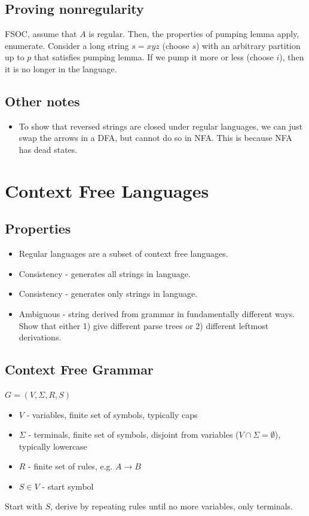 \documentclass{article}
\begin{document}
\subsection{Proving nonregularity}
FSOC, assume that $A$ is regular. Then, the properties of pumping lemma apply, enumerate. Consider a long string $s=xyz$ (choose $s$) with an arbitrary partition up to $p$ that satisfies pumping lemma. If we pump it more or less (choose $i$), then it is no longer in the language.

\subsection{Other notes}
\begin{itemize}
    \item To show that reversed strings are closed under regular languages, we can just swap the arrows in a DFA, but cannot do so in NFA. This is because NFA has dead states.
\end{itemize}


\section{Context Free Languages}
\subsection{Properties}
\begin{itemize}
    \item Regular languages are a subset of context free languages.
    \item Consistency - generates all strings in language.
    \item Consistency - generates only strings in language.
    \item Ambiguous - string derived from grammar in fundamentally different ways. Show that either 1) give different parse trees or 2) different leftmost derivations.
\end{itemize}

\subsection{Context Free Grammar}
$G = (V, \Sigma, R, S)$
\begin{itemize}
    \item $V$ - variables, finite set of symbols, typically caps
    \item $\Sigma$ - terminals, finite set of symbols, disjoint from variables ($V \cap \Sigma = \emptyset$), typically lowercase
    \item $R$ - finite set of rules, e.g. $A \to B$
    \item $S \in V$ - start symbol
\end{itemize}
Start with $S$, derive by repeating rules until no more variables, only terminals.
\end{document}
